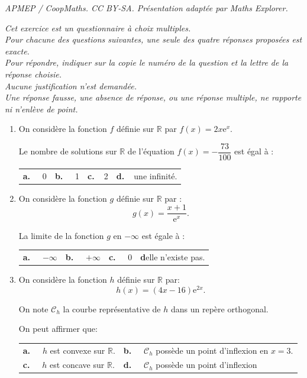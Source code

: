 \documentclass[10pt]{article}
\providecommand{\R}{\mathbb{R}}
\providecommand{\e}{{\mathrm{e}}}
\begin{document}
\noindent\textit{APMEP / CoopMaths. CC BY-SA. Présentation adaptée par Maths Explorer.}\par\medskip
\medskip

\emph{Cet exercice est un questionnaire à choix multiples.\\Pour chacune des questions suivantes, une seule des quatre réponses proposées est exacte.\\Pour répondre, indiquer sur la copie le numéro de la question et la lettre de la réponse choisie.\\Aucune justification n'est demandée.\\Une réponse fausse, une absence de réponse, ou une réponse multiple, ne rapporte
ni n'enlève de point.}

\medskip

\begin{enumerate}
\item On considère la fonction $f$ définie sur $\R$ par $f(x) = 2x\e^x$.

Le nombre de solutions sur $\R$ de l'équation $f(x) = - \dfrac{73}{100}$ est égal à :

\begin{center}
\begin{tabularx}{\linewidth}{*{4}{X}}
\textbf{a.~~} 0 &\textbf{b.~~} 1 &\textbf{c.~~}2&\textbf{d.~~}une infinité.
\end{tabularx}
\end{center}

\item On considère la fonction $g$ définie sur $\R$ par :
\[g(x) = \dfrac{x+ 1}{\e^x}.\]

La limite de la fonction $g$ en $- \infty$ est égale à : 

\begin{center}
\begin{tabularx}{\linewidth}{*{4}{X}}
\textbf{a.~~} $-\infty$&\textbf{b.~~} $+\infty$ &\textbf{c.~~} 0&\textbf{d}elle n'existe pas.
\end{tabularx}
\end{center}

\item On considère la fonction $h$ définie sur $\R$ par:
\[h(x) = (4x - 16)\e^{2x}.\]

On note $\mathcal{C}_h$ la courbe représentative de $h$ dans un repère orthogonal.

On peut affirmer que:

\begin{center}
\begin{tabularx}{\linewidth}{*{2}{X}}
\textbf{a.~~} $h$ est convexe sur $\R$.&\textbf{b.~~} $\mathcal{C}_h$ possède un point d'inflexion en $x = 3$.\\
\textbf{c.~~} $h$ est concave sur $\R$.&\textbf{d.~~} $\mathcal{C}_h$ possède un point d'inflexion 


\end{tabularx}
\end{center}
\end{enumerate}
\end{document}
